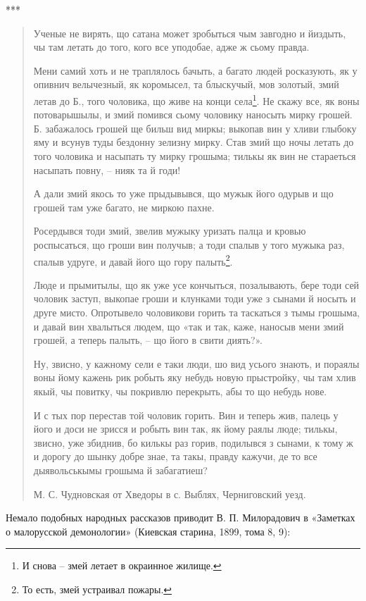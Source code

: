 \begin{center}
***\end{center}

\begin{quotation}
Ученые не вирять, що сатана может зробыться чым завгодно и йиздыть, чы там летать до того, кого все уподобае, адже ж сьому правда.

Мени самий хоть и не траплялось бачыть, а багато людей росказують, як у опивнич велычезный, як коромысел, та блыскучый, мов золотый, змий летав до Б., того чоловика, що живе на конци села\footnote{И снова – змей летает в окраинное жилище.}. Не скажу все, як воны потоварышылы, и змий помився сьому чоловику наносыть мирку грошей. Б. забажалось грошей ще бильш вид миркы; выкопав вин у хливи глыбоку яму и всунув туды бездонну зелизну мирку. Став змий що ночы летать до того чоловика и насыпать ту мирку грошыма; тилькы як вин не стараеться насыпать повну, – нияк та й годи!

А дали змий якось то уже прыдывывся, що мужык його одурыв и що грошей там уже багато, не миркою пахне.

Росердывся тоди змий, звелив мужыку уризать палца и кровью роспысаться, що гроши вин получыв; а тоди спалыв у того мужыка раз, спалыв удруге, и давай його що гору палыть\footnote{То есть, змей устраивал пожары.}.

Люде и прымитылы, що як уже усе кончыться, позалывають, бере тоди сей чоловик заступ, выкопае гроши и клунками тоди уже з сынами й носыть и друге мисто. Опротывело чоловикови горить та таскаться з тымы грошыма, и давай вин хвалыться людем, що «так и так, каже, наносыв мени змий грошей, а теперь палыть, – що його в свити диять?».

Ну, звисно, у кажному сели е таки люди, шо вид усього знають, и пораялы воны йому кажень рик робыть яку небудь новую прыстройку, чы там хлив якый, чы повитку, чы покривлю перекрыть, абы то що небудь нове.

И с тых пор перестав той чоловик горить. Вин и теперь жив, палець у його и доси не зрисся и робыть вин так, як йому раялы люде; тилькы, звисно, уже збиднив, бо килькы раз горив, подилывся з сынами, к тому ж и дорогу до шынку добре знае, та такы, правду кажучи, де то все дыявольськымы грошыма й забагатиеш?

М. С. Чудновская от Хведоры в с. Выблях, Черниговский уезд.
\end{quotation}

Немало подобных народных рассказов приводит В. П. Милорадович в «Заметках о малорусской демонологии» (Киевская старина, 1899, тома 8, 9):

